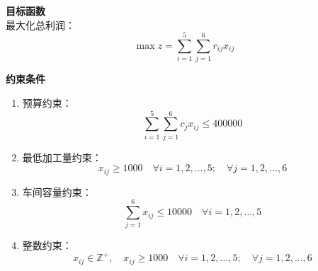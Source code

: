 \textbf{目标函数}\\
最大化总利润：
\[
\max z = \sum_{i=1}^5 \sum_{j=1}^6 r_{ij} x_{ij}
\]

\textbf{约束条件}
\begin{enumerate}
    \item 预算约束：
    \[
    \sum_{i=1}^5 \sum_{j=1}^6 c_j x_{ij} \leq 400000
    \]
    \item 最低加工量约束：
    \[
    x_{ij} \geq 1000 \quad \forall i = 1, 2, \ldots, 5; \quad \forall j = 1, 2, \ldots, 6
    \]
    \item 车间容量约束：
    \[
    \sum_{j=1}^6 x_{ij} \leq 10000 \quad \forall i = 1, 2, \ldots, 5
    \]
    \item 整数约束：
    \[
    x_{ij} \in \mathbb{Z}^+, \quad x_{ij} \geq 1000 \quad \forall i = 1, 2, \ldots, 5; \quad \forall j = 1, 2, \ldots, 6
    \]
\end{enumerate}
